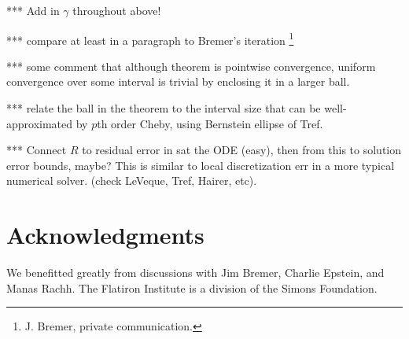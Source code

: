 \documentclass[10pt]{article}
\begin{document}
*** Add in $\gamma$ throughout above!

*** compare at least in a paragraph to Bremer's iteration
\footnote{J. Bremer, private communication.}

*** some comment that although theorem is pointwise convergence,
uniform convergence over some interval is trivial by enclosing it in
a larger ball.

*** relate the ball in the theorem to the interval size that
can be well-approximated by $p$th order Cheby,
using Bernstein ellipse of Tref.

*** Connect $R$ to residual error in sat the ODE (easy),
then from this to solution error bounds, maybe?
This is similar to local discretization err
in a more typical numerical solver.
(check LeVeque, Tref, Hairer, etc).


\section*{Acknowledgments}
We benefitted greatly from discussions with Jim Bremer, Charlie Epstein,
and Manas Rachh.
The Flatiron Institute is a division of the Simons Foundation.






\end{document}
